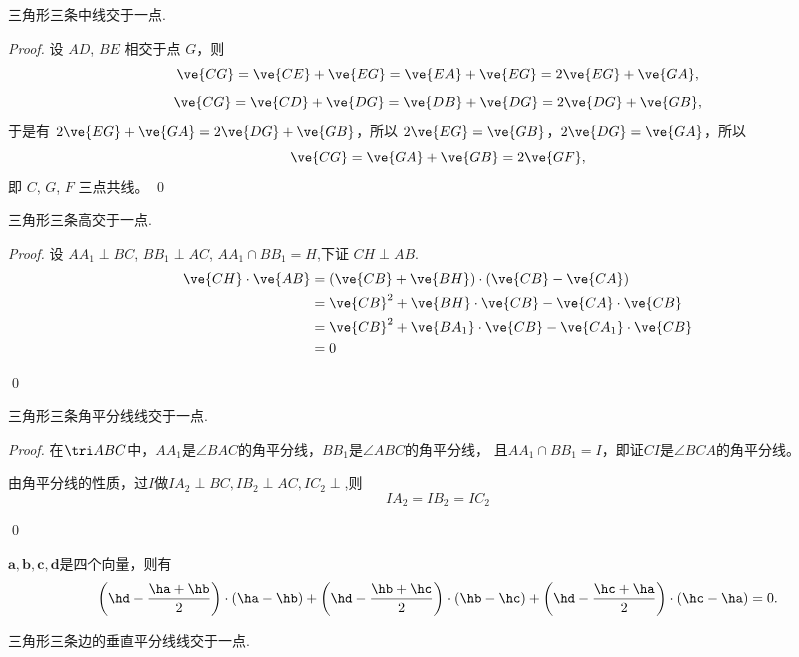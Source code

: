 \begin{proposition}
    三角形三条中线交于一点.
\end{proposition}
\begin{proof}
    设 $AD$, $BE$ 相交于点 $G$，则
\[
\ve{CG} = \ve{CE} + \ve{EG} = \ve{EA} + \ve{EG} = 2\ve{EG} + \ve{GA},
\]
\[
\ve{CG} = \ve{CD} + \ve{DG} = \ve{DB} + \ve{DG} = 2\ve{DG} + \ve{GB},
\]
于是有 $2\ve{EG} + \ve{GA} = 2\ve{DG} + \ve{GB}$，所以 $2\ve{EG} = \ve{GB}$，$2\ve{DG} = \ve{GA}$，所以
\[
\ve{CG} = \ve{GA} + \ve{GB} = 2\ve{GF},
\]
即 $C$, $G$, $F$ 三点共线。
\qed
\end{proof}
\begin{proposition}
    三角形三条高交于一点.
\end{proposition}
\begin{proof}
    设 $AA_1 \perp BC$, $BB_1 \perp AC$, $AA_1 \cap BB_1 = H$,下证 $CH \perp AB$.
\begin{align*}
    \ve{CH} \cdot \ve{AB}&= (\ve{CB} + \ve{BH}) \cdot (\ve{CB} - \ve{CA})\\
                         &= \ve{CB}^2 + \ve{BH} \cdot \ve{CB} - \ve{CA} \cdot \ve{CB}\\
                         &= \ve{CB}^2 + \ve{BA_1} \cdot \ve{CB} - \ve{CA_1} \cdot \ve{CB}\\
                         &= 0 
\end{align*}

\qed

\end{proof}
\begin{proposition}
    三角形三条角平分线线交于一点.
\end{proposition}
\begin{proof}
    在\(\tri ABC\)中，\(AA_1\)是\(\angle BAC\)的角平分线，\(BB_1\)是\(\angle ABC\)的角平分线，
    且\(AA_1\cap BB_1=I\)，即证\(CI\)是\(\angle BCA\)的角平分线。

    由角平分线的性质，过\(I\)做\(IA_2\perp BC,IB_2\perp AC,IC_2\perp\),则
    \[IA_2=IB_2=IC_2\]

    \qed
\end{proof}
\begin{lemma}
    \(\boldsymbol{a},\boldsymbol{b},\boldsymbol{c},\boldsymbol{d}\)是四个向量，则有
    \[
\left(\hd - \frac{\ha+\hb}{2}\right) \cdot (\ha-\hb) + \left(\hd-\frac{\hb+\hc}{2}\right) \cdot (\hb-\hc) + \left(
    \hd - \frac{\hc+\ha}{2}\right) \cdot (\hc-\ha) = 0.
\]
\end{lemma}
\begin{proposition}
    三角形三条边的垂直平分线线交于一点.
\end{proposition}

